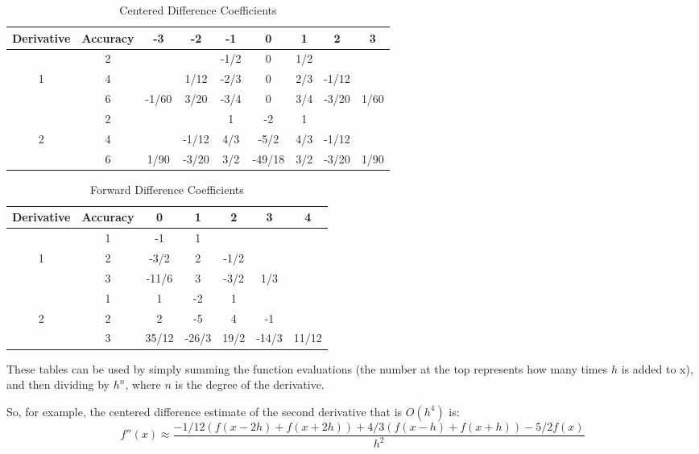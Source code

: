 \begin{table}
\begin{center}
\begin{tabular}{|c|c|c|c|c|c|c|c|c|}
\hline
Derivative & Accuracy & -3 & -2 & -1 & 0 & 1 & 2 & 3 \\ \hline
 & 2 & & & -1/2 & 0 & 1/2 & & \\ \cline{2-9}
 1 & 4 & & 1/12 & -2/3 &  0 & 2/3 & -1/12 & \\ \cline{2-9}
  & 6 & -1/60 & 3/20 & -3/4 & 0 & 3/4 & -3/20 & 1/60 \\ \hline
  & 2 & & & 1 & -2 & 1 & & \\ \cline{2-9}
 2 & 4 & & -1/12 & 4/3 &  -5/2 & 4/3 & -1/12 & \\ \cline{2-9}
  & 6 & 1/90 & -3/20 & 3/2 & -49/18 & 3/2 & -3/20 & 1/90 \\ \hline
\end{tabular}
\caption{Centered Difference Coefficients}
\label{Table:CDiff}
\end{center}
\end{table}

\begin{table}
\begin{center}
\begin{tabular}{|c|c|c|c|c|c|c|}
\hline
Derivative & Accuracy & 0 & 1 & 2 & 3 & 4 \\ \hline
 & 1 & -1 & 1 &  & &  \\ \cline{2-7}
 1 & 2 & -3/2 & 2 & -1/2 & &  \\ \cline{2-7}
  & 3 & -11/6 & 3 & -3/2 & 1/3 &  \\ \hline
  & 1 & 1 & -2 & 1 &  & \\ \cline{2-7}
 2 & 2 & 2 & -5 & 4 &  -1 &  \\ \cline{2-7}
  & 3 & 35/12 & -26/3 & 19/2 & -14/3 & 11/12 \\ \hline
\end{tabular}
\caption{Forward Difference Coefficients}
\label{Table:FDiff}
\end{center}
\end{table}

These tables can be used by simply summing the function evaluations (the number at the top represents how many times $h$ is added to x), and then dividing by $h^n$, where $n$ is the degree of the derivative.

So, for example, the centered difference estimate of the second derivative that is $O(h^4)$ is:
\[
f''(x) \approx \frac{-1/12(f(x-2h) + f(x+2h)) + 4/3(f(x-h) + f(x+h)) -5/2f(x)}{h^2}
\]

